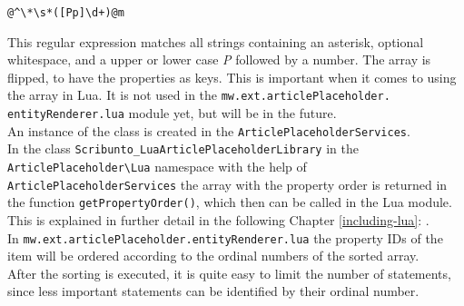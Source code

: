 \begin{lstlisting}[frame=single] 
@^\*\s*([Pp]\d+)@m
\end{lstlisting}
This regular expression matches all strings containing an asterisk, optional whitespace, and a upper or lower case \textit{P} followed by a number.
The array is flipped, to have the properties as keys. This is important when it comes to using the array in Lua. It is not used in the \texttt{\justify mw.ext.articlePlaceholder. entityRenderer.lua} module yet, but will be in the future. \\
An instance of the class is created in the \texttt{\justify ArticlePlaceholderServices}. \\
In the class \texttt{\justify Scribunto\_LuaArticlePlaceholderLibrary} in the \texttt{\justify ArticlePlaceholder\textbackslash{}Lua} namespace with the help of \texttt{\justify ArticlePlaceholderServices} the array with the property order is returned in the function \texttt{\justify getPropertyOrder()}, which then can be called in the Lua module. This is explained in further detail in the following Chapter \ref{including-lua}: . \\
In \texttt{\justify mw.ext.articlePlaceholder.entityRenderer.lua} the property IDs of the item will be ordered according to the ordinal numbers of the sorted array. \\ 
After the sorting is executed, it is quite easy to limit the number of statements, since less important statements can be identified by their ordinal number.